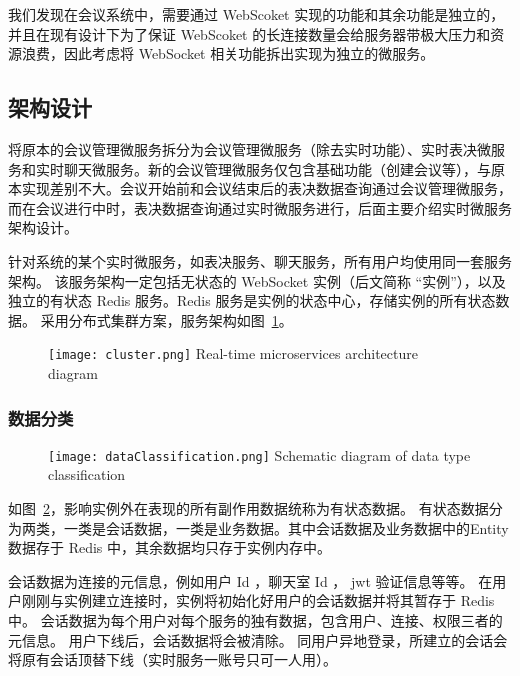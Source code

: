 我们发现在会议系统中，需要通过 WebScoket 实现的功能和其余功能是独立的，并且在现有设计下为了保证 WebScoket 的长连接数量会给服务器带极大压力和资源浪费，因此考虑将 WebSocket 相关功能拆出实现为独立的微服务。

\subsection{架构设计}
将原本的会议管理微服务拆分为会议管理微服务（除去实时功能）、实时表决微服务和实时聊天微服务。新的会议管理微服务仅包含基础功能（创建会议等），与原本实现差别不大。会议开始前和会议结束后的表决数据查询通过会议管理微服务，而在会议进行中时，表决数据查询通过实时微服务进行，后面主要介绍实时微服务架构设计。

针对系统的某个实时微服务，如表决服务、聊天服务，所有用户均使用同一套服务架构。
该服务架构一定包括无状态的 WebSocket 实例（后文简称 “实例”），以及独立的有状态 Redis 服务。Redis 服务是实例的状态中心，存储实例的所有状态数据。
采用分布式集群方案，服务架构如图~\ref{fig:cluster}。

\begin{figure}[!htp]
  \centering
  \texttt{[image: cluster.png]}
    {Real-time microservices architecture diagram}
 \label{fig:cluster}
\end{figure}

\subsubsection{数据分类}

\begin{figure}[!htp]
  \centering
  \texttt{[image: dataClassification.png]}
    {Schematic diagram of data type classification}
 \label{fig:dataClassification}
\end{figure}

如图~\ref{fig:dataClassification}，影响实例外在表现的所有副作用数据统称为有状态数据。
有状态数据分为两类，一类是会话数据，一类是业务数据。其中会话数据及业务数据中的Entity数据存于 Redis 中，其余数据均只存于实例内存中。

会话数据为连接的元信息，例如用户 Id ，聊天室 Id ， jwt 验证信息等等。
在用户刚刚与实例建立连接时，实例将初始化好用户的会话数据并将其暂存于 Redis 中。
会话数据为每个用户对每个服务的独有数据，包含用户、连接、权限三者的元信息。
用户下线后，会话数据将会被清除。
同用户异地登录，所建立的会话会将原有会话顶替下线（实时服务一账号只可一人用）。

